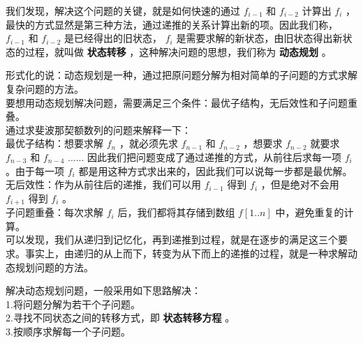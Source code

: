 \documentclass{beamer}
\newcommand{\fdf}[1]{\alert{\textbf{#1}}}
\begin{document}
\begin{frame}
我们发现，解决这个问题的关键，就是如何快速的通过 $f_{i - 1}$ 和 $f_{i - 2}$ 计算出 $f_i$ ，最快的方式显然是第三种方法，通过递推的关系计算出新的项。因此我们称， $f_{i - 1}$ 和 $f_{i - 2}$ 是已经得出的旧状态， $f_i$ 是需要求解的新状态，由旧状态得出新状态的过程，就叫做 \fdf{状态转移} ，这种解决问题的思想，我们称为 \fdf{动态规划} 。
\end{frame}
\begin{frame}
形式化的说：动态规划是一种，通过把原问题分解为相对简单的子问题的方式求解复杂问题的方法。 \\ 
要想用动态规划解决问题，需要满足三个条件：最优子结构，无后效性和子问题重叠。	\\ 
通过求斐波那契额数列的问题来解释一下：\\ 
最优子结构：想要求解 $f_n$ ，就必须先求 $f_{n - 1}$ 和 $f_{n - 2}$ ，想要求 $f_{n - 2}$ 就要求 $f_{n - 3}$ 和 $f_{n -4}$ ...... 因此我们把问题变成了通过递推的方式，从前往后求每一项 $f_i$ 。由于每一项 $f_i$ 都是用这种方式求出来的，因此我们可以说每一步都是最优解。 \\ 
无后效性：作为从前往后的递推，我们可以用 $f_{i - 1}$ 得到 $f_i$ ，但是绝对不会用 $f_{i + 1}$ 得到 $f_i$ 。 \\
子问题重叠：每次求解 $f_i$ 后，我们都将其存储到数组 $f[1..n]$ 中，避免重复的计算。 \\
可以发现，我们从递归到记忆化，再到递推到过程，就是在逐步的满足这三个要求。事实上，由递归的从上而下，转变为从下而上的递推的过程，就是一种求解动态规划问题的方法。\\ 
\end{frame}
\begin{frame}
解决动态规划问题，一般采用如下思路解决：\\ 
1.将问题分解为若干个子问题。 \\ 
2.寻找不同状态之间的转移方式，即 \fdf{状态转移方程} 。 \\ 
3.按顺序求解每一个子问题。
\end{frame}
\end{document}
